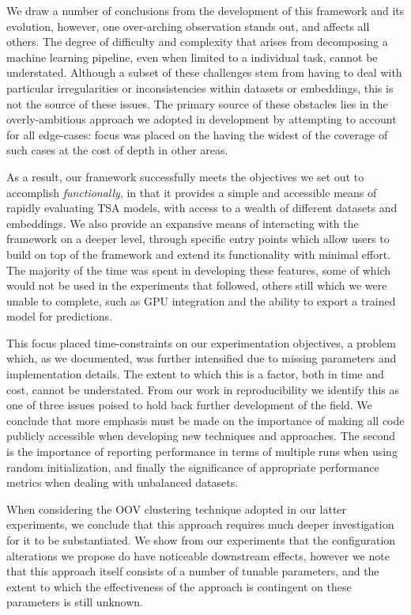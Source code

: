 \documentclass[../../fyp.tex]{subfiles}
\begin{document}
We draw a number of conclusions from the development of this framework and its evolution, however, one over-arching observation stands out, and affects all others. The degree of difficulty and complexity that arises from decomposing a machine learning pipeline, even when limited to a individual task, cannot be understated. Although a subset of these challenges stem from having to deal with particular irregularities or inconsistencies within datasets or embeddings, this is not the source of these issues. The primary source of these obstacles lies in the overly-ambitious approach we adopted in development by attempting to account for all edge-cases: focus was placed on the having the widest of the coverage of such cases at the cost of depth in other areas. 

As a result, our framework successfully meets the objectives we set out to accomplish \textit{functionally}, in that it provides a simple and accessible means of rapidly evaluating TSA models, with access to a wealth of different datasets and embeddings. We also provide an expansive means of interacting with the framework on a deeper level, through specific entry points which allow users to build on top of the framework and extend its functionality with minimal effort. The majority of the time was spent in developing these features, some of which would not be used in the experiments that followed, others still which we were unable to complete, such as GPU integration and the ability to export a trained model for predictions. 

This focus placed time-constraints on our experimentation objectives, a problem which, as we documented, was further intensified due to missing parameters and implementation details. The extent to which this is a factor, both in time and cost, cannot be understated. From our work in reproducibility we identify this as one of three issues poised to hold back further development of the field. We conclude that more emphasis must be made on the importance of making all code publicly accessible when developing new techniques and approaches. The second is the importance of reporting performance in terms of multiple runs when using random initialization, and finally the significance of appropriate performance metrics when dealing with unbalanced datasets. 

When considering the OOV clustering technique adopted in our latter experiments, we conclude that this approach requires much deeper investigation for it to be substantiated. We show from our experiments that the configuration alterations we propose do have noticeable downstream effects, however we note that this approach itself consists of a number of tunable parameters, and the extent to which the effectiveness of the approach is contingent on these parameters is still unknown. 
\end{document}
